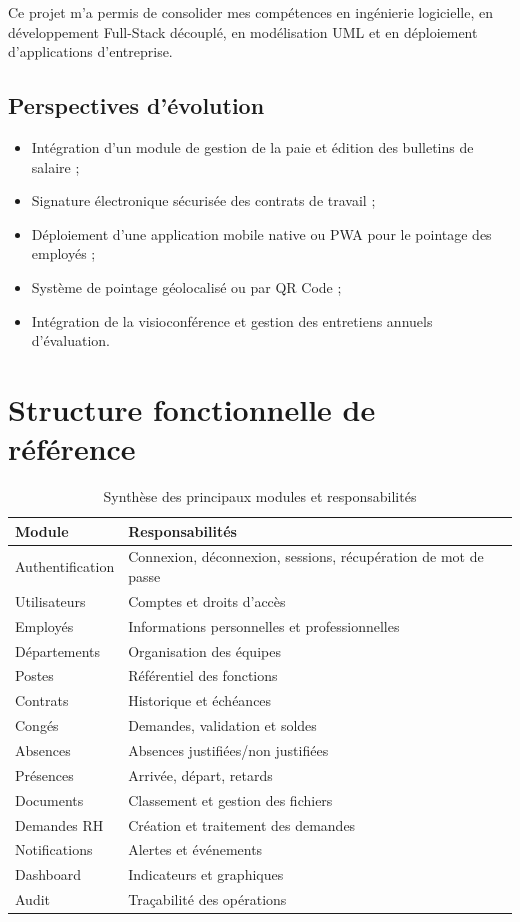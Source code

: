 \documentclass[12pt,a4paper]{report}
\begin{document}
Ce projet m'a permis de consolider mes compétences en ingénierie logicielle, en développement Full-Stack découplé, en modélisation UML et en déploiement d'applications d'entreprise.

\section*{Perspectives d'évolution}
\begin{itemize}
    \item Intégration d'un module de gestion de la paie et édition des bulletins de salaire ;
    \item Signature électronique sécurisée des contrats de travail ;
    \item Déploiement d'une application mobile native ou PWA pour le pointage des employés ;
    \item Système de pointage géolocalisé ou par QR Code ;
    \item Intégration de la visioconférence et gestion des entretiens annuels d'évaluation.
\end{itemize}

\appendix
\chapter{Structure fonctionnelle de référence}

\begin{table}[H]
\centering
\caption{Synthèse des principaux modules et responsabilités}
\label{tab:annexe_modules}
\begin{tabularx}{\textwidth}{l X}
\toprule
\textbf{Module} & \textbf{Responsabilités} \\
\midrule
Authentification & Connexion, déconnexion, sessions, récupération de mot de passe \\
Utilisateurs & Comptes et droits d'accès \\
Employés & Informations personnelles et professionnelles \\
Départements & Organisation des équipes \\
Postes & Référentiel des fonctions \\
Contrats & Historique et échéances \\
Congés & Demandes, validation et soldes \\
Absences & Absences justifiées/non justifiées \\
Présences & Arrivée, départ, retards \\
Documents & Classement et gestion des fichiers \\
Demandes RH & Création et traitement des demandes \\
Notifications & Alertes et événements \\
Dashboard & Indicateurs et graphiques \\
Audit & Traçabilité des opérations \\
\bottomrule
\end{tabularx}
\end{table}
\end{document}
